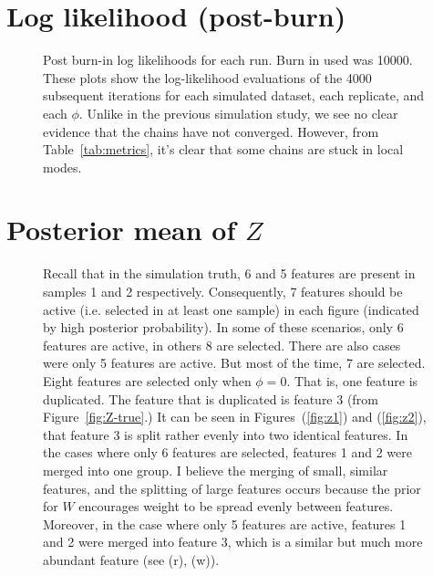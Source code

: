 \documentclass[10pt]{article} %
\begin{document}
\newpage
\section{Log likelihood (post-burn)}
\begin{figure}[H]
  \begin{center}  %
  \end{center}
  \caption{Post burn-in log likelihoods for each run. Burn in used was 10000.
    These plots show the log-likelihood evaluations of the 4000 subsequent
    iterations for each simulated dataset, each replicate, and each $\phi$.
    Unlike in the previous simulation study, we see no clear evidence that 
    the chains have not converged. However, from Table~\ref{tab:metrics}, it's
    clear that some chains are stuck in local modes.}
  \label{fig:ll}
\end{figure}

\newpage
\section{Posterior mean of $Z$}
\begin{figure}[H]
  \begin{center}  %
  \end{center}
  \caption{Recall that in the simulation truth, 6 and 5 features are present in
    samples 1 and 2 respectively. Consequently, 7 features should be active
    (i.e. selected in at least one sample) in each figure (indicated by high
    posterior probability). In some of these scenarios, only 6 features are
    active, in others 8 are selected. There are also cases were only 5 features
    are active. But most of the time, 7 are selected.  Eight features are
    selected only when $\phi=0$. That is, one feature is duplicated.  The
    feature that is duplicated is feature 3 (from Figure~\ref{fig:Z-true}.) It
    can be seen in Figures~(\ref{fig:z1}) and (\ref{fig:z2}), that feature 3 is
    split rather evenly into two identical features. In the cases where only 6
    features are selected, features 1 and 2 were merged into one group. I
    believe the merging of small, similar features, and the splitting of large
    features occurs because the prior for $W$ encourages weight to be spread
    evenly between features. Moreover, in the case where only 5 features are
    active, features 1 and 2 were merged into feature 3, which is a similar but
    much more abundant feature (see (r), (w)).}
  \label{fig:zmean}
\end{figure}
\end{document}
